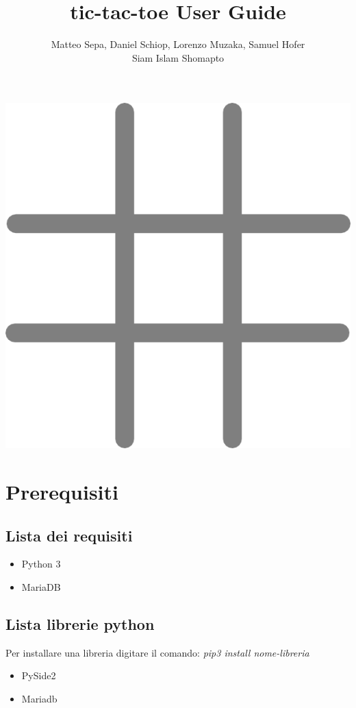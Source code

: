 \documentclass{article}
\title{tic-tac-toe User Guide}
\date{}
\author{Matteo Sepa, Daniel Schiop, Lorenzo Muzaka, Samuel Hofer \\ Siam Islam Shomapto}
\begin{document}
\maketitle
{}

\includegraphics[scale=5.5]{tictactoe.png}
\centering

\newpage
\tableofcontents
\newpage
{}

\section{Prerequisiti}

\subsection{Lista dei requisiti}
\begin{itemize}
    \item Python 3
    \item MariaDB
\end{itemize}

\subsection{Lista librerie python}
Per installare una libreria digitare il comando: \emph{pip3 install nome-libreria}
\begin{itemize}
    \item PySide2
    \item Mariadb
\end{itemize}
\end{document}
